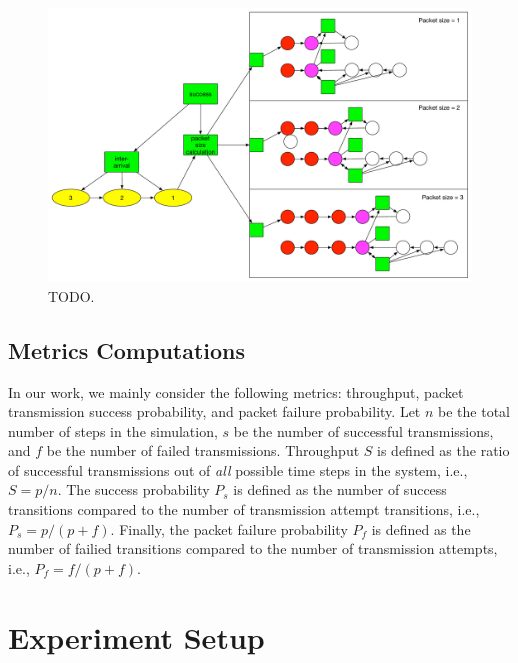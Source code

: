 \documentclass{llncs}
\begin{document}
\begin{figure}
\begin{center}
\includegraphics[scale=0.35]{../../sketches/compressible_dcf_all.pdf}
\caption{TODO.}
\label{fig:compressible_dcf_all}
\end{center}
\end{figure}

\subsection{Metrics Computations}
In our work, we mainly consider the following metrics: throughput, packet transmission success probability, and packet failure probability. Let $n$ be the total number of steps in the simulation, $s$ be the number of successful transmissions, and $f$ be the number of failed transmissions. Throughput $S$ is defined as the ratio of successful transmissions out of \emph{all} possible time steps in the system, i.e., $S = p / n$. The success probability $P_s$ is defined as the number of success transitions compared to the number of transmission attempt transitions, i.e., $P_s = p / (p + f)$. Finally, the packet failure probability $P_f$ is defined as the number of failied transitions compared to the number of transmission attempts, i.e., $P_f = f / (p + f)$. 

\section{Experiment Setup}
\end{document}

